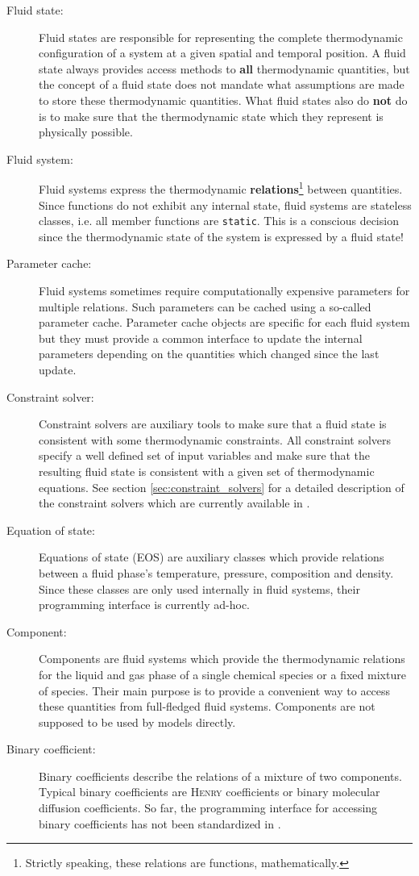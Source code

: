 \begin{description}
\item[Fluid state:] Fluid states are responsible for representing the
  complete thermodynamic configuration of a system at a given spatial
  and temporal position. A fluid state always provides access methods
  to {\bf all} thermodynamic quantities, but the concept of a fluid state does not
  mandate what assumptions are made to store these thermodynamic
  quantities. What fluid states also do {\bf not} do is to make sure
  that the thermodynamic state which they represent is physically
  possible.
\item[Fluid system:] Fluid systems express the thermodynamic {\bf
    relations}\footnote{Strictly speaking, these relations are
    functions, mathematically.} between quantities. Since functions do
  not exhibit any internal state, fluid systems are stateless classes,
  i.e. all member functions are \texttt{static}. This is a conscious
  decision since the thermodynamic state of the system is expressed by
  a fluid state!
\item[Parameter cache:] Fluid systems sometimes require
  computationally expensive parameters for multiple relations. Such
  parameters can be cached using a so-called parameter
  cache. Parameter cache objects are specific for each fluid system
  but they must provide a common interface to update the internal
  parameters depending on the quantities which changed since the last
  update.
\item[Constraint solver:] Constraint solvers are auxiliary tools to
  make sure that a fluid state is consistent with some thermodynamic
  constraints. All constraint solvers specify a well defined set of
  input variables and make sure that the resulting fluid state is
  consistent with a given set of thermodynamic equations. See section
  \ref{sec:constraint_solvers} for a detailed description of the
  constraint solvers which are currently available in \Dumux.
\item[Equation of state:] Equations of state (EOS) are auxiliary
  classes which provide relations between a fluid phase's temperature,
  pressure, composition and density. Since these classes are only used
  internally in fluid systems, their programming interface is
  currently ad-hoc.
\item[Component:] Components are fluid systems which provide the
  thermodynamic relations for the liquid and gas phase of a single
  chemical species or a fixed mixture of species. Their main purpose
  is to provide a convenient way to access these quantities from
  full-fledged fluid systems. Components are not supposed to be used
  by models directly.
\item[Binary coefficient:] Binary coefficients describe the relations
  of a mixture of two components. Typical binary coefficients are
  \textsc{Henry} coefficients or binary molecular diffusion
  coefficients. So far, the programming interface for accessing binary
  coefficients has not been standardized in \Dumux.
\end{description}

